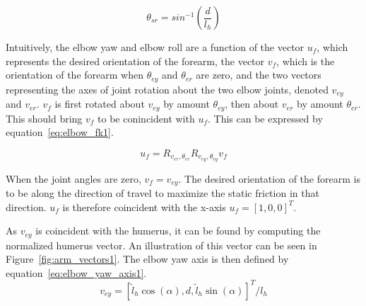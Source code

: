 \begin{equation}
	\theta_{sr} = sin^{-1} \left( \frac{d}{l_h} \right ) \label{eq:shoulder_roll1}
\end{equation}


Intuitively, the elbow yaw and elbow roll are a function of the vector $u_f$, which represents the desired 
orientation of the forearm, the vector $v_f$, which is the orientation of the forearm when 
$\theta_{ey}$ and $\theta_{er}$ are zero, and the two vectors representing the axes of joint 
rotation about the two elbow joints,
denoted $v_{ey}$ and $v_{er}$. $v_f$ is first rotated about $v_{ey}$ by amount $\theta_{ey}$, then about
$v_{er}$ by amount $\theta_{er}$. This should bring $v_f$ to be conincident with $u_f$.
This can be expressed by equation~\ref{eq:elbow_fk1}.

\begin{equation}
	u_f = R_{v_{er}, \theta_{er}} R_{v_{ey}, \theta_{ey}} v_f \label{eq:elbow_fk1}
\end{equation}

When the joint angles are zero, $v_f = v_{ey}$.
The desired orientation of the forearm is to be along the direction of travel to maximize the static friction
in that direction. $u_f$ is therefore coincident with the x-axis $u_f = [1, 0, 0]^T$.


As $v_{ey}$ is coincident with the humerus, it can be found by computing the normalized humerus vector.
An illustration of this vector can be seen in Figure~\ref{fig:arm_vectors1}. The elbow yaw axis is then defined
by equation~\ref{eq:elbow_yaw_axis1}.
\begin{equation}
	v_{ey} = [\tilde l_h \cos(\alpha), d, \tilde l_h \sin(\alpha)]^T / l_h \label{eq:elbow_yaw_axis1}
\end{equation}

